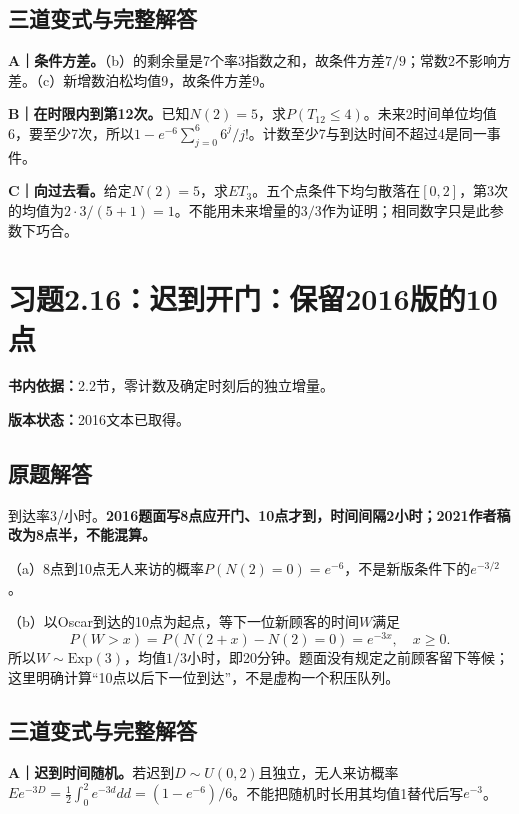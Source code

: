 \documentclass[
  11pt,
  a4paper,
  UTF8,fontset=fandol]{ctexart}
\let\OldSection\section
\renewcommand{\section}{\Needspace{7\baselineskip}\OldSection}
\let\OldSubsection\subsection
\renewcommand{\subsection}{\Needspace{5\baselineskip}\OldSubsection}
\begin{document}
\subsection{三道变式与完整解答}\label{ux4e09ux9053ux53d8ux5f0fux4e0eux5b8cux6574ux89e3ux7b54-14}

\textbf{A｜条件方差。}（b）的剩余量是7个率3指数之和，故条件方差\(7/9\)；常数2不影响方差。（c）新增数泊松均值9，故条件方差9。

\textbf{B｜在时限内到第12次。}已知\(N(2)=5\)，求\(P(T_{12}\le4)\)。未来2时间单位均值6，要至少7次，所以\(1-e^{-6}\sum_{j=0}^6 6^j/j!\)。计数至少7与到达时间不超过4是同一事件。

\textbf{C｜向过去看。}给定\(N(2)=5\)，求\(ET_3\)。五个点条件下均匀散落在\([0,2]\)，第3次的均值为\(2\cdot3/(5+1)=1\)。不能用未来增量的\(3/3\)作为证明；相同数字只是此参数下巧合。

\newpage

\section{习题2.16：迟到开门：保留2016版的10点}\label{ux4e60ux98982.16ux8fdfux5230ux5f00ux95e8ux4fddux75592016ux7248ux768410ux70b9}

\textbf{书内依据：}2.2节，零计数及确定时刻后的独立增量。

\textbf{版本状态：}2016文本已取得。

\subsection{原题解答}\label{ux539fux9898ux89e3ux7b54-15}

到达率3/小时。\textbf{2016题面写8点应开门、10点才到，时间间隔2小时；2021作者稿改为8点半，不能混算。}

（a）8点到10点无人来访的概率\(\boxed{P(N(2)=0)=e^{-6}}\)，不是新版条件下的\(e^{-3/2}\)。

（b）以Oscar到达的10点为起点，等下一位新顾客的时间\(W\)满足
\[P(W>x)=P(N(2+x)-N(2)=0)=e^{-3x},\quad x\ge0.\]
所以\(\boxed{W\sim\mathrm{Exp}(3)}\)，均值\(1/3\)小时，即20分钟。题面没有规定之前顾客留下等候；这里明确计算``10点以后下一位到达''，不是虚构一个积压队列。

\subsection{三道变式与完整解答}\label{ux4e09ux9053ux53d8ux5f0fux4e0eux5b8cux6574ux89e3ux7b54-15}

\textbf{A｜迟到时间随机。}若迟到\(D\sim U(0,2)\)且独立，无人来访概率\(Ee^{-3D}=\frac12\int_0^2e^{-3d}dd=(1-e^{-6})/6\)。不能把随机时长用其均值1替代后写\(e^{-3}\)。
\end{document}
